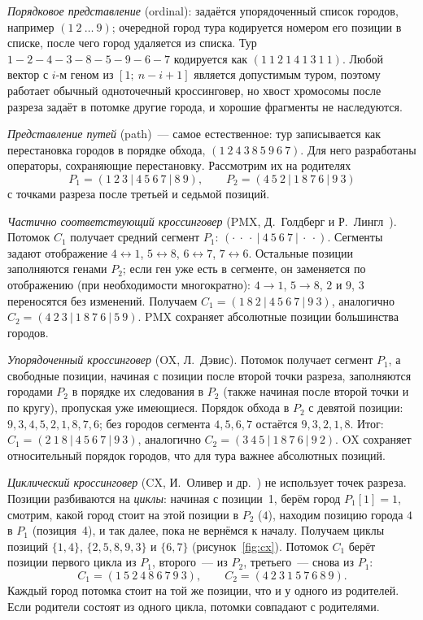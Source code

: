 \emph{Порядковое представление} (ordinal): задаётся упорядоченный список городов, например
$(1\ 2\ \ldots\ 9)$; очередной город тура кодируется номером его позиции в списке, после чего город
удаляется из списка. Тур $1{-}2{-}4{-}3{-}8{-}5{-}9{-}6{-}7$ кодируется как $(1\ 1\ 2\ 1\ 4\ 1\ 3\ 1\ 1)$.
Любой вектор с $i$-м геном из $[1;\ n - i + 1]$ является допустимым туром, поэтому работает обычный
одноточечный кроссинговер, но хвост хромосомы после разреза задаёт в потомке другие города, и хорошие
фрагменты не наследуются.

\emph{Представление путей} (path)~--- самое естественное: тур записывается как перестановка городов в
порядке обхода, $(1\ 2\ 4\ 3\ 8\ 5\ 9\ 6\ 7)$. Для него разработаны операторы, сохраняющие перестановку.
Рассмотрим их на родителях
\[
P_1 = (1\ 2\ 3\ |\ 4\ 5\ 6\ 7\ |\ 8\ 9), \qquad P_2 = (4\ 5\ 2\ |\ 1\ 8\ 7\ 6\ |\ 9\ 3)
\]
с точками разреза после третьей и седьмой позиций.

\emph{Частично соответствующий кроссинговер} (PMX, Д.~Голдберг и Р.~Лингл~\cite{goldberg1985}). Потомок
$C_1$ получает средний сегмент $P_1$: $(\cdot\ \cdot\ \cdot\ |\ 4\ 5\ 6\ 7\ |\ \cdot\ \cdot)$. Сегменты задают
отображение $4 \leftrightarrow 1$, $5 \leftrightarrow 8$, $6 \leftrightarrow 7$, $7 \leftrightarrow 6$.
Остальные позиции заполняются генами $P_2$; если ген уже есть в сегменте, он заменяется по отображению
(при необходимости многократно): $4 \to 1$, $5 \to 8$, $2$ и $9$, $3$ переносятся без изменений.
Получаем $C_1 = (1\ 8\ 2\ |\ 4\ 5\ 6\ 7\ |\ 9\ 3)$, аналогично $C_2 = (4\ 2\ 3\ |\ 1\ 8\ 7\ 6\ |\ 5\ 9)$. PMX
сохраняет абсолютные позиции большинства городов.

\emph{Упорядоченный кроссинговер} (OX, Л.~Дэвис). Потомок получает сегмент $P_1$, а свободные позиции,
начиная с позиции после второй точки разреза, заполняются городами $P_2$ в порядке их следования в
$P_2$ (также начиная после второй точки и по кругу), пропуская уже имеющиеся. Порядок обхода в $P_2$ с
девятой позиции: $9, 3, 4, 5, 2, 1, 8, 7, 6$; без городов сегмента $4, 5, 6, 7$ остаётся
$9, 3, 2, 1, 8$. Итог: $C_1 = (2\ 1\ 8\ |\ 4\ 5\ 6\ 7\ |\ 9\ 3)$, аналогично
$C_2 = (3\ 4\ 5\ |\ 1\ 8\ 7\ 6\ |\ 9\ 2)$. OX сохраняет относительный порядок городов, что для тура
важнее абсолютных позиций.

\emph{Циклический кроссинговер} (CX, И.~Оливер и др.~\cite{oliver1987}) не использует точек разреза. Позиции
разбиваются на \emph{циклы}: начиная с позиции~1, берём город $P_1[1] = 1$, смотрим, какой город стоит на
этой позиции в $P_2$ ($4$), находим позицию города $4$ в $P_1$ (позиция~4), и так далее, пока не
вернёмся к началу. Получаем циклы позиций $\{1, 4\}$, $\{2, 5, 8, 9, 3\}$ и $\{6, 7\}$
(рисунок~\ref{fig:cx}). Потомок $C_1$ берёт позиции первого цикла из $P_1$, второго~--- из $P_2$,
третьего~--- снова из $P_1$:
\[
C_1 = (1\ 5\ 2\ 4\ 8\ 6\ 7\ 9\ 3), \qquad C_2 = (4\ 2\ 3\ 1\ 5\ 7\ 6\ 8\ 9).
\]
Каждый город потомка стоит на той же позиции, что и у одного из родителей. Если родители состоят из
одного цикла, потомки совпадают с родителями.


